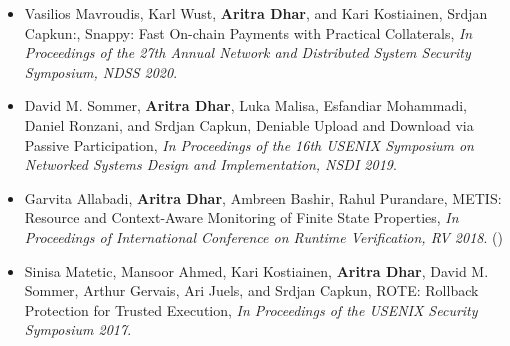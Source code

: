  \begin{itemize}
   \item Vasilios Mavroudis, Karl Wust, \textbf{Aritra Dhar}, and Kari Kostiainen, Srdjan Capkun:, Snappy: Fast On-chain Payments with Practical Collaterals, \emph{In Proceedings of the 27th Annual Network and Distributed System Security Symposium, NDSS 2020}. 
   \item David M. Sommer, \textbf{Aritra Dhar}, Luka Malisa, Esfandiar Mohammadi, Daniel Ronzani, and Srdjan Capkun, Deniable Upload and Download via Passive Participation, \emph{In Proceedings of the 16th USENIX Symposium on Networked Systems Design and Implementation, NSDI 2019}.
   \item Garvita Allabadi, \textbf{Aritra Dhar}, Ambreen Bashir, Rahul Purandare, METIS: Resource and Context-Aware Monitoring of Finite State Properties, \emph{In Proceedings of International Conference on Runtime Verification, RV 2018}. (\faTrophy)
   \item Sinisa Matetic, Mansoor Ahmed, Kari Kostiainen, \textbf{Aritra Dhar}, David M. Sommer, Arthur Gervais, Ari Juels, and Srdjan Capkun, ROTE: Rollback Protection for Trusted Execution, \emph{In Proceedings of the USENIX Security Symposium 2017}.
 \end{itemize}